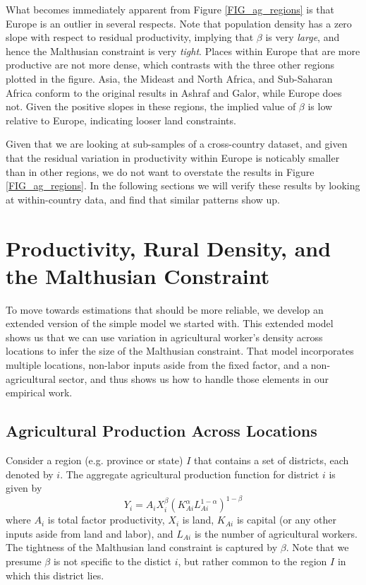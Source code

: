 \documentclass[11pt]{article}
\begin{document}
What becomes immediately apparent from Figure \ref{FIG_ag_regions} is that Europe is an outlier in several respects. Note that population density has a zero slope with respect to residual productivity, implying that $\beta$ is very \textit{large}, and hence the Malthusian constraint is very \textit{tight}. Places within Europe that are more productive are not more dense, which contrasts with the three other regions plotted in the figure. Asia, the Mideast and North Africa, and Sub-Saharan Africa conform to the original results in Ashraf and Galor, while Europe does not. Given the positive slopes in these regions, the implied value of $\beta$ is low relative to Europe, indicating looser land constraints.

Given that we are looking at sub-samples of a cross-country dataset, and given that the residual variation in productivity within Europe is noticably smaller than in other regions, we do not want to overstate the results in Figure \ref{FIG_ag_regions}. In the following sections we will verify these results by looking at within-country data, and find that similar patterns show up.

\section{Productivity, Rural Density, and the Malthusian Constraint}
To move towards estimations that should be more reliable, we develop an extended version of the simple model we started with. This extended model shows us that we can use variation in agricultural worker's density across locations to infer the size of the Malthusian constraint. That model incorporates multiple locations, non-labor inputs aside from the fixed factor, and a non-agricultural sector, and thus shows us how to handle those elements in our empirical work.

\subsection{Agricultural Production Across Locations}
Consider a region (e.g. province or state) $I$ that contains a set of districts, each denoted by $i$. The aggregate agricultural production function for district $i$ is given by 
\begin{equation}
Y_{i} = A_{i} X_{i}^{\beta} \left(K_{Ai}^{\alpha}L_{Ai}^{1-\alpha}\right)^{1-\beta} \label{EQ_production}
\end{equation}
where $A_{i}$ is total factor productivity, $X_{i}$ is land, $K_{Ai}$ is capital (or any other inputs aside from land and labor), and $L_{Ai}$ is the number of agricultural workers. The tightness of the Malthusian land constraint is captured by $\beta$. Note that we presume $\beta$ is not specific to the distict $i$, but rather common to the region $I$ in which this district lies.
\end{document}
